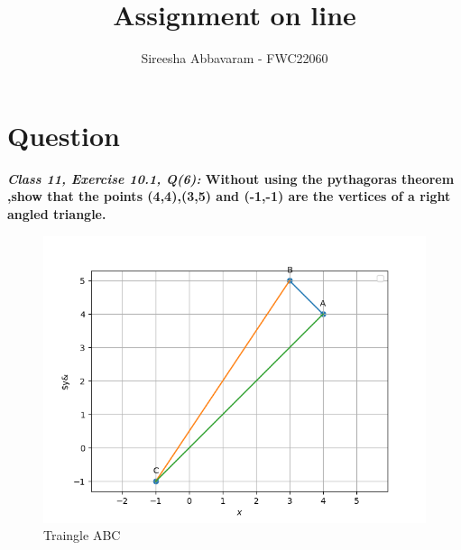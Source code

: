 \documentclass[journal,12pt,twocolumn]{IEEEtran}
\title{\textbf{\\Assignment on line}}
\author{Sireesha Abbavaram - FWC22060}
\begin{document}
\maketitle


\section{Question}
\textbf{\textit{Class 11, Exercise 10.1, Q(6):} Without using the pythagoras theorem ,show that the points (4,4),(3,5) and (-1,-1) are the vertices of a right angled triangle.}

\begin{figure}[h!]
\centering
\includegraphics[scale=0.35]{triangle.png}
\centering
\caption{Traingle ABC}
\end{figure}
\end{document}
